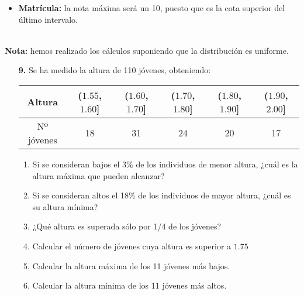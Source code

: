 \documentclass[11pt,a4paper]{article}
\theoremstyle{definition}
\begin{document}
\begin{itemize}
\begin{table}[!htbp]
\end{table}

\item \textbf{Matrícula:} la nota máxima será un 10, puesto que es la cota superior del último intervalo.
	
\end{itemize}

\hspace{1cm} \\
\small {\textbf {Nota:} hemos realizado los cálculos suponiendo que la distribución es uniforme.} 



\pagebreak

\begin{itemize}
	\item[\textbf{9.}] Se ha medido la altura de 110 jóvenes, obteniendo:


\begin{table}[!htbp]
\hspace{1.2cm}
\begin{tabular}{|c|c|c|c|c|c|}
\hline
Altura & ($1.55$, $1.60$] & ($1.60$, $1.70$] & ($1.70$, $1.80$] & ($1.80$, $1.90$] & ($1.90$, $2.00$] \\ \hline
Nº jóvenes & 18 & 31 & 24 & 20 & 17 \\ \hline
\end{tabular}
\end{table}
	\begin{enumerate}[label=\emph{\alph*})]
		\item Si se consideran bajos el 3\% de los individuos de menor altura, ¿cuál es la altura máxima que pueden alcanzar?
		\item Si se consideran altos el 18\% de los individuos de mayor altura, ¿cuál es su altura mínima?
		\item ¿Qué altura es superada sólo por 1/4 de los jóvenes?
		\item Calcular el número de jóvenes cuya altura es superior a $1.75$
		\item Calcular la altura máxima de los 11 jóvenes más bajos.
		\item Calcular la altura mínima de los 11 jóvenes más altos.
	\end{enumerate}
\end{itemize}
\end{document}
